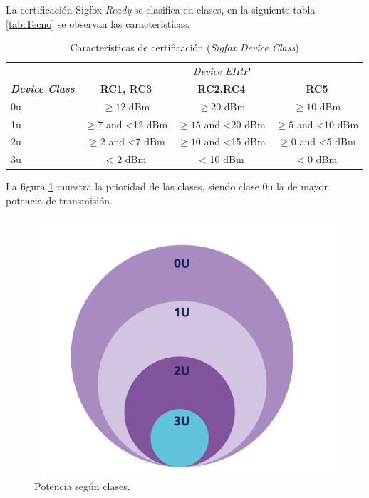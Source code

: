 La certificación Sigfox \textit{Ready} se clasifica en clases, en la  siguiente tabla \ref{tab:Tecno} se observan las características\cite{CertificationSigfox}.
\begin{table}[h]
	\centering
	\caption[Sigfox \textit{Ready}]{Caracteristicas de certificación (\textit{Sigfox Device Class}) }
	\begin{tabular}{l c c c}    
		\toprule
		\textbf{  } & \multicolumn{3}{c}{\textit{Device EIRP}} \\ \cline{2-4} 
		\textbf{ \textit{Device Class} } & \textbf{RC1, RC3} & \textbf{RC2,RC4} 	& \textbf{RC5} \\
		\midrule
		0u	    &$\ge12$ dBm 	&$\ge20$ dBm & $\ge10$ dBm \\	
		1u	&$\ge7$ and <12 dBm &$\ge15$ and <20 dBm & $\ge5$ and <10 dBm\\
		2u	&$\ge2$ and <7 dBm & $\ge10$ and <15 dBm & $\ge0$ and <5 dBm \\	
		3u	&< 2 dBm &< 10 dBm &< 0 dBm   \\
		\bottomrule
		\hline
	\end{tabular}
	\label{tab:ZonasSigfox}
\end{table}

La figura \ref{fig:certificacion} muestra la prioridad de las clases, siendo clase 0u la de mayor potencia de transmisión\cite{CertificationSigfox}.
\begin{figure}[h]
	\centering
	\includegraphics[scale=.65]{./Figures/certificacion.PNG}
	\caption{Potencia según clases.}
	\label{fig:certificacion}
\end{figure}

